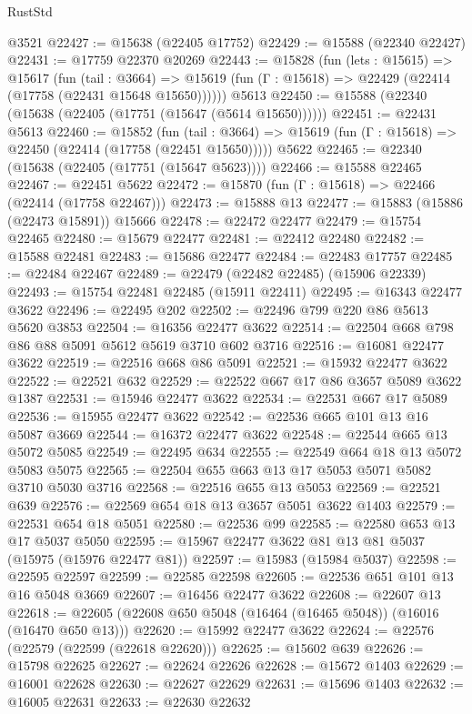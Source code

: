 \begin{lexlean}{RustStd}
\begin{coremodule}
    @3521
@22427 := @15638 (@22405 @17752)
@22429 := @15588 (@22340 @22427)
@22431 := @17759 @22370 @20269
@22443 := @15828
    (fun (lets : @15615) =>
    @15617
      (fun (tail : @3664) =>
      @15619 (fun (Γ : @15618) => @22429 (@22414 (@17758 (@22431 @15648 @15650))))))
    @5613
@22450 := @15588 (@22340 (@15638 (@22405 (@17751 (@15647 (@5614 @15650))))))
@22451 := @22431 @5613
@22460 := @15852
    (fun (tail : @3664) => @15619 (fun (Γ : @15618) => @22450 (@22414 (@17758 (@22451 @15650)))))
    @5622
@22465 := @22340 (@15638 (@22405 (@17751 (@15647 @5623))))
@22466 := @15588 @22465
@22467 := @22451 @5622
@22472 := @15870 (fun (Γ : @15618) => @22466 (@22414 (@17758 @22467)))
@22473 := @15888 @13
@22477 := @15883 (@15886 (@22473 @15891)) @15666
@22478 := @22472 @22477
@22479 := @15754 @22465
@22480 := @15679 @22477
@22481 := @22412 @22480
@22482 := @15588 @22481
@22483 := @15686 @22477
@22484 := @22483 @17757
@22485 := @22484 @22467
@22489 := @22479 (@22482 @22485) (@15906 @22339)
@22493 := @15754 @22481 @22485 (@15911 @22411)
@22495 := @16343 @22477 @3622
@22496 := @22495 @202
@22502 := @22496 @799 @220 @86 @5613 @5620 @3853
@22504 := @16356 @22477 @3622
@22514 := @22504 @668 @798 @86 @88 @5091 @5612 @5619 @3710 @602 @3716
@22516 := @16081 @22477 @3622
@22519 := @22516 @668 @86 @5091
@22521 := @15932 @22477 @3622
@22522 := @22521 @632
@22529 := @22522 @667 @17 @86 @3657 @5089 @3622 @1387
@22531 := @15946 @22477 @3622
@22534 := @22531 @667 @17 @5089
@22536 := @15955 @22477 @3622
@22542 := @22536 @665 @101 @13 @16 @5087 @3669
@22544 := @16372 @22477 @3622
@22548 := @22544 @665 @13 @5072 @5085
@22549 := @22495 @634
@22555 := @22549 @664 @18 @13 @5072 @5083 @5075
@22565 := @22504 @655 @663 @13 @17 @5053 @5071 @5082 @3710 @5030 @3716
@22568 := @22516 @655 @13 @5053
@22569 := @22521 @639
@22576 := @22569 @654 @18 @13 @3657 @5051 @3622 @1403
@22579 := @22531 @654 @18 @5051
@22580 := @22536 @99
@22585 := @22580 @653 @13 @17 @5037 @5050
@22595 := @15967 @22477 @3622 @81 @13 @81 @5037 (@15975 (@15976 @22477 @81))
@22597 := @15983 (@15984 @5037)
@22598 := @22595 @22597
@22599 := @22585 @22598
@22605 := @22536 @651 @101 @13 @16 @5048 @3669
@22607 := @16456 @22477 @3622
@22608 := @22607 @13
@22618 := @22605 (@22608 @650 @5048 (@16464 (@16465 @5048)) (@16016 (@16470 @650 @13)))
@22620 := @15992 @22477 @3622
@22624 := @22576 (@22579 (@22599 (@22618 @22620)))
@22625 := @15602 @639
@22626 := @15798 @22625
@22627 := @22624 @22626
@22628 := @15672 @1403
@22629 := @16001 @22628
@22630 := @22627 @22629
@22631 := @15696 @1403
@22632 := @16005 @22631
@22633 := @22630 @22632

\end{coremodule}
\end{lexlean}
